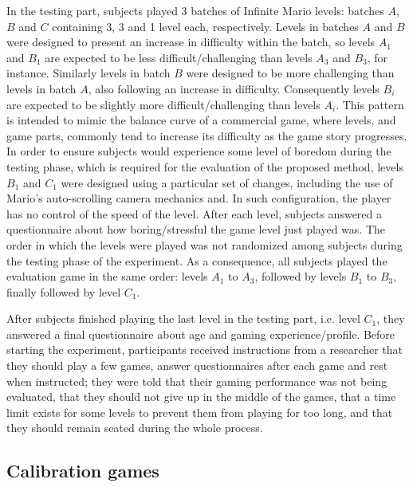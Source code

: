 In the testing part, subjects played 3 batches of Infinite Mario levels: batches $A$, $B$ and $C$ containing 3, 3 and 1 level each, respectively. Levels in batches $A$ and $B$ were designed to present an increase in difficulty within the batch, so levels $A_1$ and $B_1$ are expected to be less difficult/challenging than levels $A_3$ and $B_3$, for instance. Similarly levels in batch $B$ were designed to be more challenging than levels in batch $A$, also following an increase in difficulty. Consequently levels $B_i$ are expected to be slightly more difficult/challenging than levels $A_i$. This pattern is intended to mimic the balance curve of a commercial game, where levels, and game parts, commonly tend to increase its difficulty as the game story progresses. In order to ensure subjects would experience some level of boredom during the testing phase, which is required for the evaluation of the proposed method, levels $B_1$ and $C_1$ were designed using a particular set of changes, including the use of Mario's auto-scrolling camera mechanics and. In such configuration, the player has no control of the speed of the level. After each level, subjects answered a questionnaire about how boring/stressful the game level just played was. The order in which the levels were played was not randomized among subjects during the testing phase of the experiment. As a consequence, all subjects played the evaluation game in the same order: levels $A_1$ to $A_3$, followed by levels $B_1$ to $B_3$, finally followed by level $C_1$.


After subjects finished playing the last level in the testing part, i.e. level $C_1$, they answered a final questionnaire about age and gaming experience/profile. Before starting the experiment, participants received instructions from a researcher that they should play a few games, answer questionnaires after each game and rest when instructed; they were told that their gaming performance was not being evaluated, that they should not give up in the middle of the games, that a time limit exists for some levels to prevent them from playing for too long, and that they should remain seated during the whole process.

\subsection{Calibration games}
\label{sec:experiment2-calibration-games}

